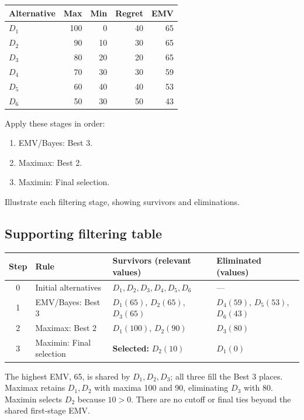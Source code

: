 \vspace{-3mm}
\begin{center}\small\setlength{\tabcolsep}{4pt}
	\begin{tabular}{lrrrr}\toprule
		Alternative & Max & Min & Regret & EMV\\ \midrule
		$D_1$ & 100 & 0 & 40 & 65\\
		$D_2$ & 90 & 10 & 30 & 65\\
		$D_3$ & 80 & 20 & 20 & 65\\
		$D_4$ & 70 & 30 & 30 & 59\\
		$D_5$ & 60 & 40 & 40 & 53\\
		$D_6$ & 50 & 30 & 50 & 43\\
		\bottomrule
	\end{tabular}
\end{center}
\vspace{-3mm}

Apply these stages in order:
\begin{enumerate}[leftmargin=*]
	\item EMV/Bayes: Best 3.
	\item Maximax: Best 2.
	\item Maximin: Final selection.
\end{enumerate}
Illustrate each filtering stage, showing survivors and eliminations.
\label{sol:q3table}
\subsection*{Supporting filtering table}
\begin{center}\small
\begin{tabularx}{\textwidth}{@{}c >{\raggedright\arraybackslash}p{} >{\raggedright\arraybackslash}X >{\raggedright\arraybackslash}p{}@{}}
\toprule
Step & Rule & Survivors (relevant values) & Eliminated (values)\\\midrule
0 & Initial alternatives & $D_1,D_2,D_3,D_4,D_5,D_6$ & ---\\
1 & EMV/Bayes: Best 3 & $D_1(65)$, $D_2(65)$, $D_3(65)$ & $D_4(59)$, $D_5(53)$, $D_6(43)$\\
2 & Maximax: Best 2 & $D_1(100)$, $D_2(90)$ & $D_3(80)$\\
3 & Maximin: Final selection & \textbf{Selected:} $D_2(10)$ & $D_1(0)$\\
\bottomrule\end{tabularx}
\end{center}
The highest EMV, 65, is shared by $D_1,D_2,D_3$; all three fill the Best 3 places. Maximax retains $D_1,D_2$ with maxima 100 and 90, eliminating $D_3$ with 80. Maximin selects $D_2$ because $10>0$. There are no cutoff or final ties beyond the shared first-stage EMV.
\secInicio[sec:q3]
\clearpage
{}\label{sol:q3tree}

